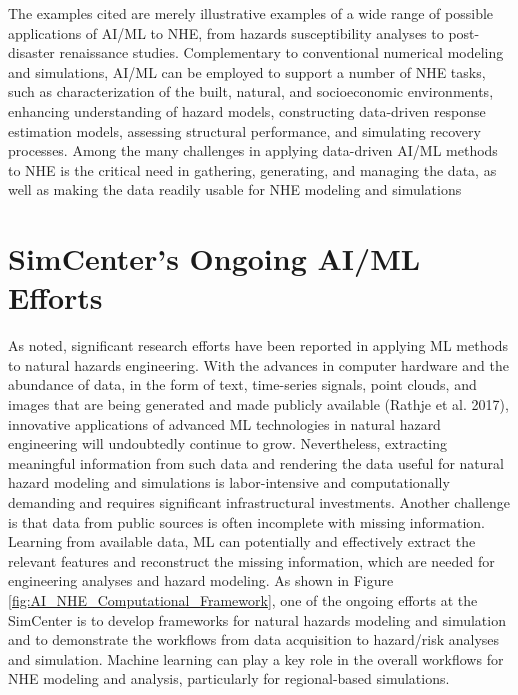 The examples cited are merely illustrative examples of a wide range of possible applications of AI/ML to NHE, from hazards susceptibility analyses to post-disaster renaissance studies. Complementary to conventional numerical modeling and simulations, AI/ML can be employed to support a number of NHE tasks, such as characterization of the built, natural, and socioeconomic environments, enhancing understanding of hazard models, constructing data-driven response estimation models, assessing structural performance, and simulating recovery processes. Among the many challenges in applying data-driven AI/ML methods to NHE is the critical need in gathering, generating, and managing the data, as well as making the data readily usable for NHE modeling and simulations \citep{padgett2020workshop}

\section{SimCenter's Ongoing AI/ML Efforts}
\label{sec:ai_simcenter}

As noted, significant research efforts have been reported in applying ML methods to natural hazards engineering. With the advances in computer hardware and the abundance of data, in the form of text, time-series signals, point clouds, and images that are being generated and made publicly available (Rathje et al. 2017), innovative applications of advanced ML technologies in natural hazard engineering will undoubtedly continue to grow. Nevertheless, extracting meaningful information from such data and rendering the data useful for natural hazard modeling and simulations is labor-intensive and computationally demanding and requires significant infrastructural investments. Another challenge is that data from public sources is often incomplete with missing information. Learning from available data, ML can potentially and effectively extract the relevant features and reconstruct the missing information, which are needed for engineering analyses and hazard modeling. As shown in Figure \ref{fig:AI_NHE_Computational_Framework}, one of the ongoing efforts at the SimCenter is to develop frameworks for natural hazards modeling and simulation and to demonstrate the workflows from data acquisition to hazard/risk analyses and simulation. Machine learning can play a key role in the overall workflows for NHE modeling and analysis, particularly for regional-based simulations. 

